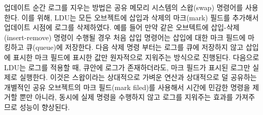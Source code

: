 
업데이트 순간 로그를 지우는 방법은 공유 메모리 시스템의 스왑(swap) 명령어를 사용한다.
이를 위해, LDU는 모든 오브젝트에 삽입과 삭제의 마크(mark) 필드를 추가해서 업데이트 시점에 로그를 
삭제하였다. 
예를 들어 만약 같은 오브텍트에 삽입-삭제(insert-remove) 명령이 수행될 경우 처음 삽입 명령어는
삽입에 대한 마크 필드에 마킹하고 큐(queue)에 저장한다. 
다음 삭제 명령 부터는 로그를 큐에 저장하지 않고 삽입에 표시한 마크 필드에 표시한 값만
원자적으로 지워주는 방식으로 진행된다.
다음으로 LDU는 로그를 적용할 때, 큐안에 로그가 존재하더라도, 마크 필드가 표시된 로그만 
실제로 실행한다.
이것은 스왑이라는 상대적으로 가벼운 연산과 상대적으로 덜 공유하는 개별적인 공유 오브젝트의
마크 필드(mark filed)를 사용해서 시간에 민감한 명령을 제거할 뿐만 아니라, 동시에 실제
명령을 수행하지 않고 로그를 지워주는 효과를 가져주므로 성능이 향상된다. 



